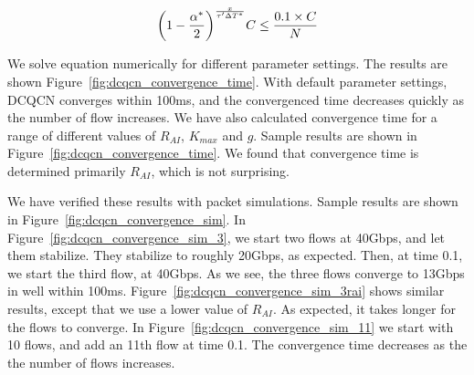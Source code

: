 \begin{equation} 
\small 
{ \left( {1 - \frac{{{\alpha ^*}}}{2}} \right)^{\frac{x}{{\tau '\Delta{T^*}}}}}C \le \frac{0.1 \times C}{N} 
\end{equation}

We solve equation numerically for different parameter settings. The results are
shown Figure~\ref{fig:dcqcn_convergence_time}. With default parameter settings,
DCQCN converges within 100ms, and the convergenced time decreases quickly as the
number of flow increases.  We have also calculated convergence time for a range
of different values of $R_{AI}$, $K_{max}$ and $g$. Sample results are shown in
Figure~\ref{fig:dcqcn_convergence_time}. We found that convergence time is
determined primarily $R_{AI}$, which is not surprising.

We have verified these results with packet simulations. Sample results are shown
in Figure~\ref{fig:dcqcn_convergence_sim}. In
Figure~\ref{fig:dcqcn_convergence_sim_3}, we start two flows at 40Gbps, and let
them stabilize. They stabilize to roughly 20Gbps, as expected. Then, at time
0.1, we start the third flow, at 40Gbps. As we see, the three flows converge to
13Gbps in well within 100ms. Figure~\ref{fig:dcqcn_convergence_sim_3rai} shows
similar results, except that we use a lower value of $R_{AI}$. As expected, it
takes longer for the flows to converge. In
Figure~\ref{fig:dcqcn_convergence_sim_11} we start with 10 flows, and add an
11th flow at time 0.1. The convergence time decreases as the the number of flows
increases.








